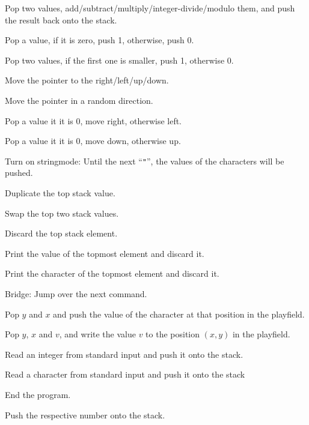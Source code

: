 \begin{description}[labelsep=1em]
    \item[\texttt{+} \texttt{-} \texttt{*} \texttt{/} \texttt{\%}] Pop two values, add/subtract/multiply/integer-divide/modulo them, and push the result back onto the stack.
    \item[\texttt{!}] Pop a value, if it is zero, push 1, otherwise, push 0.
    \item[\texttt{`}] Pop two values, if the first one is smaller, push 1, otherwise 0.
    \item[\texttt{>} \texttt{<} \texttt{\textasciicircum} \texttt{v}] Move the pointer to the right/left/up/down.
    \item[\texttt{?}] Move the pointer in a random direction.
    \item[\texttt{\_}] Pop a value it it is 0, move right, otherwise left.
    \item[\texttt{|}] Pop a value it it is 0, move down, otherwise up.
    \item[\texttt{"}] Turn on stringmode: Until the next “\texttt{"}”, the values of the \ascii{} characters will be pushed.
    \item[\texttt{:}] Duplicate the top stack value.
    \item[\texttt{\textbackslash}] Swap the top two stack values.
    \item[\texttt{\$}] Discard the top stack element.
    \item[\texttt{.}] Print the value of the topmost element and discard it.
    \item[\texttt{,}] Print the \ascii{} character of the topmost element and discard it.
    \item[\texttt{\#}] Bridge: Jump over the next command.
    \item[\texttt{g}] Pop $y$ and $x$ and push the \ascii{} value of the character at that position in the playfield.
    \item[\texttt{p}] Pop $y$, $x$ and $v$, and write the \ascii{} value $v$ to the position $(x,y)$ in the playfield.
    \item[\texttt{\&}] Read an integer from standard input and push it onto the stack.
    \item[\texttt{\~}] Read a character from standard input and push it onto the stack
    \item[\texttt{@}] End the program.
    \item[\texttt{0-9}] Push the respective number onto the stack.
\end{description}

